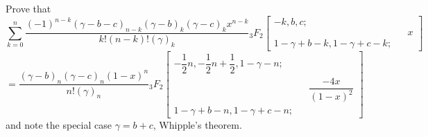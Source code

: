 \begin{problem}\label{problem8chapter5}
Prove that
$$\displaystyle\sum_{k=0}^n\!\!\dfrac{(-1)^{n-k}(\gamma - b -c)_{n-k} (\gamma - b)_k (\gamma-c)_k x^{n-k}}{k! (n-k)! (\gamma)_k} {}_3F_2 \left[ \begin{array}{rlr}
-k, b, c; \\
& & \!\!\!\!x \\
\!\!\!1\!-\!\gamma\!+\!b\!-\!k\!,\!1\!-\!\gamma\!+\!c\!-\!k\!; & & 
\end{array} \right]$$
$$= \dfrac{(\gamma-b)_n(\gamma-c)_n(1-x)^n}{n!(\gamma)_n} {}_3F_2 \left[ \begin{array}{rlr}
-\dfrac{1}{2}n, -\dfrac{1}{2}n+ \dfrac{1}{2}, 1-\gamma-n; & & \\
& & \dfrac{-4x}{(1-x)^2} \\
1 - \gamma + b - n, 1 - \gamma + c - n; & & 
\end{array} \right]$$
and note the special case $\gamma = b+c$, Whipple's theorem.
\end{problem}
